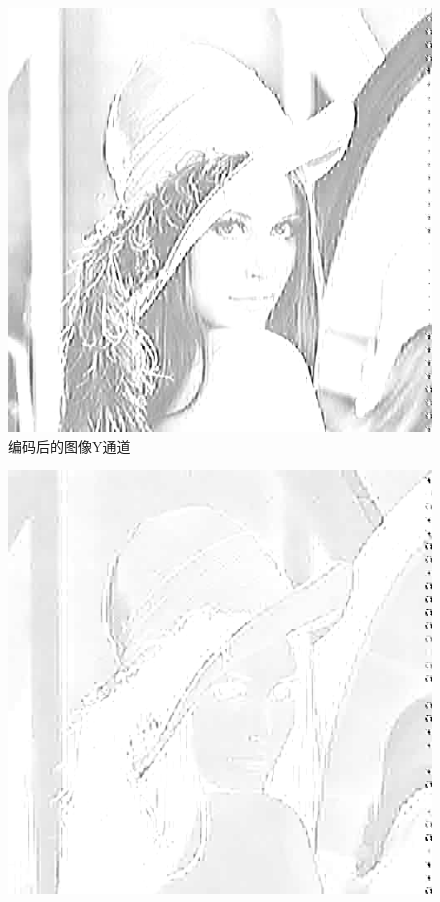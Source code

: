 \documentclass{article}
\numberwithin {equation}{section}
\begin{document}
\begin{spacing}{1.25}
  \begin{figure}[H]
    \centering
    \includegraphics[scale=0.4]{../src/test/Y_channal.jpg}
    \caption{编码后的图像Y通道}
    \label{Y channal image}
  \end{figure}
  \begin{figure}[H]
    \centering
    \includegraphics[scale=0.4]{../src/test/Cb_channal.jpg}

\end{figure}
\end{spacing}
\end{document}
